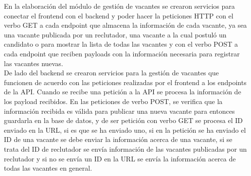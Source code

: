 En la elaboración del módulo de gestión de vacantes se crearon servicios para conectar el frontend con el backend y poder hacer la peticiones HTTP con el verbo GET a cada endpoint que almacena la información de cada vacante, ya sea una vacante publicada por un reclutador, una vacante a la cual postuló un candidato o para mostrar la lista de todas las vacantes y con el verbo POST a cada endpoint que reciben payloads con la información necesaria para registrar las vacantes nuevas. \\
\newline
De lado del backend se crearon servicios para la gestión de vacantes que funcionen de acuerdo con las peticiones realizadas por el frontend a los endpoints de la API. Cuando se recibe una petición a la API se procesa la información de los payload recibidos. En las peticiones de verbo POST, se verifica que la información recibida es válida para publicar una nueva vacante para entonces guardarla en la base de datos, y de ser petición con verbo GET se procesa el ID enviado en la URL, si es que se ha enviado uno, si en la petición se ha enviado el ID de una vacante se debe enviar la información acerca de una vacante, si se trata del ID de reclutador se envía información de las vacantes publicadas por un reclutador y si no se envía un ID en la URL se envía la información acerca de todas las vacantes en general.
